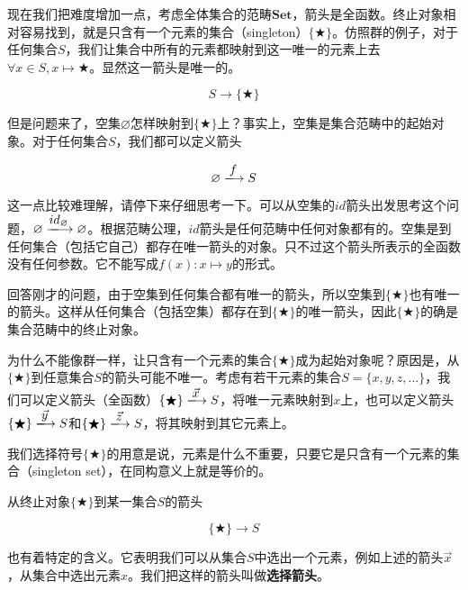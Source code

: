 \documentclass{article}
\begin{document}
\begin{example}
现在我们把难度增加一点，考虑全体集合的范畴$\pmb{Set}$，箭头是全函数。终止对象相对容易找到，就是只含有一个元素的集合（singleton）$\{ \bigstar \}$。仿照群的例子，对于任何集合$S$，我们让集合中所有的元素都映射到这一唯一的元素上去$\forall x \in S, x \mapsto \bigstar$。显然这一箭头是唯一的。

\[
  S \longrightarrow \{ \bigstar \}
\]

但是问题来了，空集$\varnothing$怎样映射到$\{ \bigstar \}$上？事实上，空集是集合范畴中的起始对象。对于任何集合$S$，我们都可以定义箭头

\[
  \varnothing \arrowto{f} S
\]

这一点比较难理解，请停下来仔细思考一下。可以从空集的$id$箭头出发思考这个问题，$\varnothing \arrowto{id_{\varnothing}} \varnothing$。根据范畴公理，$id$箭头是任何范畴中任何对象都有的。空集是到任何集合（包括它自己）都存在唯一箭头的对象。只不过这个箭头所表示的全函数没有任何参数。它不能写成$f(x): x \mapsto y$的形式。

回答刚才的问题，由于空集到任何集合都有唯一的箭头，所以空集到$\{ \bigstar \}$也有唯一的箭头。这样从任何集合（包括空集）都存在到$\{ \bigstar \}$的唯一箭头，因此$\{ \bigstar \}$的确是集合范畴中的终止对象。

为什么不能像群一样，让只含有一个元素的集合$\{ \bigstar \}$成为起始对象呢？原因是，从$\{ \bigstar \}$到任意集合$S$的箭头可能不唯一。考虑有若干元素的集合$S = \{x, y, z, ...\}$，我们可以定义箭头（全函数）$\{ \bigstar \} \arrowto{\vec{x}} S$，将唯一元素映射到$x$上，也可以定义箭头$\{ \bigstar \} \arrowto{\vec{y}} S$和$\{ \bigstar \} \arrowto{\vec{z}} S$，将其映射到其它元素上。

我们选择符号$\{ \bigstar \}$的用意是说，元素是什么不重要，只要它是只含有一个元素的集合（singleton set），在同构意义上就是等价的。

\label{sec:selection-arrow} 
从终止对象$\{ \bigstar \}$到某一集合$S$的箭头

\[
  \{ \bigstar \} \longrightarrow S
\]

也有着特定的含义。它表明我们可以从集合$S$中选出一个元素，例如上述的箭头$\vec{x}$，从集合中选出元素$x$。我们把这样的箭头叫做\textbf{选择箭头}。
\end{example}
\end{document}
